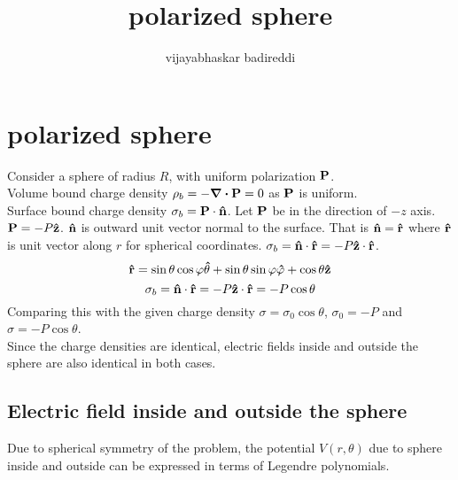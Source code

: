 \documentclass[12pt]{article}
\title{polarized sphere}
\author{vijayabhaskar badireddi}
\begin{document}
\section*{polarized sphere}
Consider a sphere of radius $R$, with uniform polarization $\vb{P}$.\\Volume bound charge density $\rho_b=-\div{\vb{P}}=0$ as $\vb{P}$ is uniform.\\ Surface bound charge density $\sigma_b=\vb{P}\cdot\vu{n}$. Let $\vb{P}$ be in the direction of $-z$ axis. $\vb{P}=-P\vu{z}$. $\vu{n}$ is outward unit vector normal to the surface. That is $\vu{n}=\vu{r}$ where $\vu{r}$ is unit vector along $r$ for spherical coordinates. $\sigma_b=\vu{n}\cdot\vu{r}=-P\vu{z}\cdot\vu{r}$.\[\vu{r}=\sin\theta\cos\varphi\vu{\theta}+\sin\theta\sin\varphi\vu{\varphi}+\cos\theta\vu{z}\]
\[\sigma_b=\vu{n}\cdot\vu{r}=-P\vu{z}\cdot\vu{r}=-P\cos\theta\]
Comparing this with the given charge density $\sigma=\sigma_0\cos\theta$, $\sigma_0=-P$ and $\sigma=-P\cos\theta$.\\
Since the charge densities are identical, electric fields inside and outside the sphere are also identical in both cases.\\
\subsection*{Electric field inside and outside the sphere}
Due to spherical symmetry of the problem, the potential $V(r,\theta)$ due to sphere inside and outside can be expressed in terms of Legendre polynomials.
\end{document}
